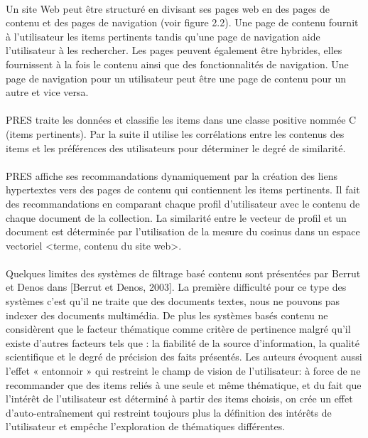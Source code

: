 \paragraph{}
Un site Web peut être structuré en divisant ses pages web en des pages de contenu et des
pages de navigation (voir figure 2.2). Une page de contenu fournit à l'utilisateur les items
pertinents tandis qu’une page de navigation aide l’utilisateur à les rechercher. Les pages peuvent
également être hybrides, elles fournissent à la fois le contenu ainsi que des fonctionnalités de
navigation. Une page de navigation pour un utilisateur peut être une page de contenu pour un
autre et vice versa.
\paragraph{}
PRES traite les données et classifie les items dans une classe positive nommée C (items
pertinents). Par la suite il utilise les corrélations entre les contenus des items et les préférences
des utilisateurs pour déterminer le degré de similarité.
\paragraph{}
PRES affiche ses recommandations dynamiquement par la création des liens hypertextes
vers des pages de contenu qui contiennent les items pertinents. Il fait des recommandations en
comparant chaque profil d'utilisateur avec le contenu de chaque document de la collection. La
similarité entre le vecteur de profil et un document est déterminée par l’utilisation de la mesure
du cosinus dans un espace vectoriel <terme, contenu du site web>.
\paragraph{}
Quelques limites des systèmes de filtrage basé contenu sont présentées par Berrut et
Denos dans [Berrut et Denos, 2003]. La première difficulté pour ce type des systèmes c’est
qu’il ne traite que des documents textes, nous ne pouvons pas indexer des documents multimédia. De plus les systèmes basés contenu ne considèrent que le facteur thématique comme
critère de pertinence malgré qu’il existe d’autres facteurs tels que : la fiabilité de la source
d’information, la qualité scientifique et le degré de précision des faits présentés. Les auteurs
évoquent aussi l’effet « entonnoir » qui restreint le champ de vision de l’utilisateur: à force de ne
recommander que des items reliés à une seule et même thématique, et du fait que l’intérêt de
l’utilisateur est déterminé à partir des items choisis, on crée un effet d’auto-entraînement qui
restreint toujours plus la définition des intérêts de l’utilisateur et empêche l’exploration de
thématiques différentes.

